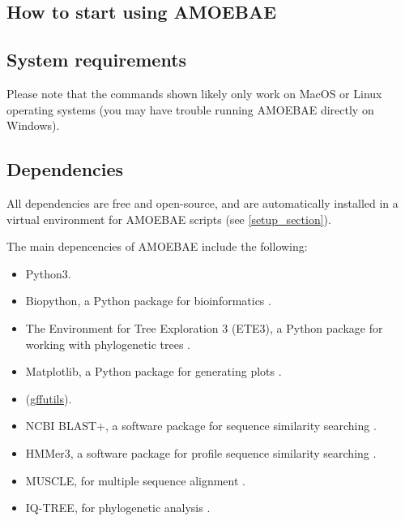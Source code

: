 \documentclass[12pt,letterpaper]{article}
\begin{document}
\begin{linenumbers}
\section{How to start using AMOEBAE}

\subsection{System requirements}

Please note that the commands shown likely only work on MacOS or Linux operating
systems (you may have trouble running AMOEBAE directly on Windows). 


\subsection{Dependencies}
\label{dependencies_section}

All dependencies are free and open-source, and are automatically installed
in a virtual environment for AMOEBAE scripts (see \autoref*{setup_section}).

The main depencencies of AMOEBAE include the following:

\begin{itemize}

\item Python3.

\item Biopython, a Python package for bioinformatics \citep{cock2009}.

\item The Environment for Tree Exploration 3 (ETE3), a Python package for
    working with phylogenetic trees \citep{huerta-cepas2016}.

\item Matplotlib, a Python package for generating plots \citep{hunter2007}.

\item (\href{https://pythonhosted.org/gffutils/}{gffutils}).

\item NCBI BLAST+, a software package for sequence similarity searching \citep{camacho2009}.

\item HMMer3, a software package for profile sequence similarity searching \citep{eddy1998}.

\item MUSCLE, for multiple sequence alignment \citep{edgar2004}.

\item IQ-TREE, for phylogenetic analysis \citep{nguyen2015}.



\end{itemize}
\end{linenumbers}
\end{document}
